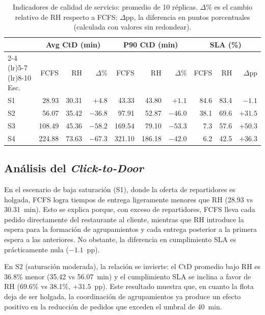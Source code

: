 \documentclass[12pt,letterpaper,oneside]{book}
\begin{document}
	\begin{table}[htbp]
	\centering
	\small
	\caption{Indicadores de calidad de servicio: promedio de 10 réplicas.  $\Delta$\% es el
	cambio relativo de RH respecto a FCFS; $\Delta$pp, la diferencia en puntos porcentuales
	(calculada con valores sin redondear).}
	\label{tab:res_ctd}
	\begin{tabular}{@{}l rr r rr r rr r@{}}
	\toprule
	& \multicolumn{3}{c}{Avg CtD (min)} & \multicolumn{3}{c}{P90 CtD (min)} & \multicolumn{3}{c}{SLA (\%)} \\
	\cmidrule(lr){2-4} \cmidrule(lr){5-7} \cmidrule(lr){8-10}
	Esc. & FCFS & RH & $\Delta$\% & FCFS & RH & $\Delta$\% & FCFS & RH & $\Delta$pp \\
	\midrule
	S1 & 28.93  & 30.31 & $+4.8$  & 43.33  & 43.80  & $+1.1$  & 84.6 & 83.4 & $-1.1$  \\
	S2 & 56.07  & 35.42 & $-36.8$ & 97.91  & 52.87  & $-46.0$ & 38.1 & 69.6 & $+31.5$ \\
	S3 & 108.49 & 45.36 & $-58.2$ & 169.54 & 79.10  & $-53.3$ & 7.3  & 57.6 & $+50.3$ \\
	S4 & 224.88 & 73.63 & $-67.3$ & 321.10 & 186.18 & $-42.0$ & 6.2  & 42.5 & $+36.3$ \\
	\bottomrule
	\end{tabular}
	\end{table}

	\subsection{Análisis del \textit{Click-to-Door}}

	En el escenario de baja saturación (S1), donde la oferta de repartidores es
	holgada, FCFS logra tiempos de entrega ligeramente menores que RH
	(28.93 vs 30.31~min).  Esto se explica porque, con exceso de repartidores,
	FCFS lleva cada pedido directamente del restaurante al cliente, mientras que
	RH introduce la espera para la formación de agrupamientos y cada entrega
	posterior a la primera espera a las anteriores.  No obstante, la diferencia en
	cumplimiento SLA es prácticamente nula ($-1.1$~pp).

	En S2 (saturación moderada), la relación se invierte: el CtD promedio bajo RH es
	36.8\% menor (35.42 vs 56.07~min) y el cumplimiento SLA
	se inclina a favor de RH (69.6\% vs 38.1\%, $+31.5$~pp).  Este resultado
	muestra que, en cuanto la flota deja de ser holgada, la
	coordinación de agrupamientos ya produce un efecto positivo en la reducción de
	pedidos que exceden el umbral de 40~min.
\end{document}
